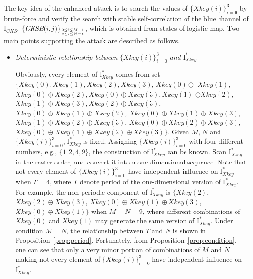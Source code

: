 \documentclass[twocolumn]{svjour3}
\newcommand\mymatrix[1]{\bm{\mathrm{#1}}}
\newcommand\Xkey{\textit{Xkey}}
\newcommand\CKS{\textit{CKS}}
\begin{document}
The key idea of the enhanced attack is to search the values of $\{\textit{Xkey}(i)\}_{i=0}^3$ by brute-force
and verify the search with stable self-correlation of the blue channel of $\mymatrix{I}_{\CKS}$, $\{\textit{CKSB}(i,j)\}_{0\leq i\leq M-1 \atop 0\leq j\leq N-1}$,
which is obtained from states of logistic map. Two main points supporting the attack are described as follows.
\begin{itemize}
\item \textit{Deterministic relationship between $\{\textit{Xkey}(i)\}_{i=0}^3$ and $\mymatrix{I}_{\Xkey}^*$}

Obviously, every element of $\mymatrix{I}_{\Xkey}^*$ comes from set $\{\textit{Xkey}(0), \textit{Xkey}(1), \textit{Xkey}(2), \textit{Xkey}(3)$,
$\textit{Xkey}(0)\oplus$ $\textit{Xkey}(1)$, $\textit{Xkey}(0)\oplus\textit{Xkey}(2), \textit{Xkey}(0)\oplus\textit{Xkey}(3), \textit{Xkey}(1)$
$\oplus\textit{Xkey}(2)$,
$\textit{Xkey}(1)\oplus\textit{Xkey}(3), \textit{Xkey}(2)\oplus\textit{Xkey}(3)$, $\textit{Xkey}(0)\oplus\textit{Xkey}(1)\oplus \textit{Xkey}(2)$, $
\textit{Xkey}(0)\oplus\textit{Xkey}(1)\oplus \textit{Xkey}(3)$, $\textit{Xkey}(1)\oplus\textit{Xkey}(2)\oplus \textit{Xkey}(3)$, $\textit{Xkey}(0)\oplus\textit{Xkey}(2)\oplus \textit{Xkey}(3)$,
$\textit{Xkey}(0)\oplus\textit{Xkey}(1)\oplus \textit{Xkey}(2)\oplus \textit{Xkey}(3)\}$. Given $M$, $N$ and $\{\textit{Xkey}(i)\}_{i=0}^3$, $\mymatrix{I}_{\Xkey}^*$ is fixed. Assigning $\{\textit{Xkey}(i)\}_{i=0}^3$
with four different numbers, e.g., $\{1, 2, 4, 9\}$, the construction of $\mymatrix{I}_{\Xkey}^*$ can be known. Scan $\mymatrix{I}_{\Xkey}^*$ in the raster order, and convert it into a one-dimensional sequence. Note that not every element of $\{\textit{Xkey}(i)\}_{i=0}^3$ have independent influence on $\mymatrix{I}_{\Xkey}^*$ when $T=4$, where
$T$ denote period of the one-dimensional version of $\mymatrix{I}_{\Xkey}^*$. For example, the non-periodic component of $\mymatrix{I}_{\Xkey}^*$ is
$\{\textit{Xkey}(2)$, $\textit{Xkey}(2)\oplus \textit{Xkey}(3)$, $\textit{Xkey}(0)\oplus\textit{Xkey}(1)\oplus\textit{Xkey}(3)$, $\textit{Xkey}(0)\oplus\textit{Xkey}(1)\}$ when $M=N=9$,
where different combinations of $\textit{Xkey}(0)$ and $\textit{Xkey}(1)$ may generate the same version of $\mymatrix{I}_{\Xkey}^*$.
Under condition $M=N$, the relationship between $T$ and $N$ is shown in Proposition~\ref{prop:period}. Fortunately, from Proposition~\ref{prop:condition}, one can see that only a
very minor portion of combinations of $M$ and $N$ making not every element of $\{\textit{Xkey}(i)\}_{i=0}^3$ have independent influence on $\mymatrix{I}_{\Xkey}^*$.


\end{itemize}
\end{document}
